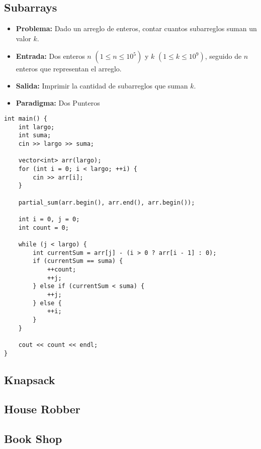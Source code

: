 \subsection{Subarrays}
\begin{itemize}
  \item \textbf{Problema: }Dado un arreglo de enteros, contar cuantos subarreglos suman un valor $k$. 
  \item \textbf{Entrada: }Dos enteros $n$ $(1 \leq n \leq 10^5)$ y $k$ $(1 \leq k \leq 10^9)$, seguido de $n$ enteros que representan el arreglo. 
  \item \textbf{Salida: }Imprimir la cantidad de subarreglos que suman $k$. 

  \item \textbf{Paradigma: } Dos Punteros
\end{itemize}
\begin{lstlisting}[style=cpp]
int main() {
    int largo;
    int suma;
    cin >> largo >> suma;

    vector<int> arr(largo);
    for (int i = 0; i < largo; ++i) {
        cin >> arr[i];
    }
    
    partial_sum(arr.begin(), arr.end(), arr.begin());

    int i = 0, j = 0;
    int count = 0;

    while (j < largo) {
        int currentSum = arr[j] - (i > 0 ? arr[i - 1] : 0);
        if (currentSum == suma) {
            ++count;
            ++j;
        } else if (currentSum < suma) {
            ++j;
        } else {
            ++i;
        }
    }

    cout << count << endl;
}
\end{lstlisting}

\subsection{Knapsack}



\subsection{House Robber}



\subsection{Book Shop}

